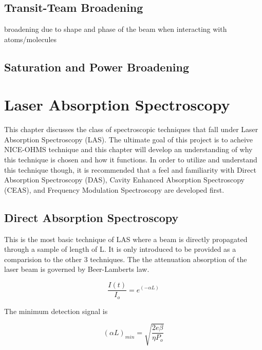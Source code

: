 \documentclass[11pt,a4paper]{book}
\begin{document}
		\subsection{Transit-Team Broadening}
			broadening due to shape and phase of the beam when interacting with atoms/molecules

		\subsection{Saturation and Power Broadening}
	\section{Laser Absorption Spectroscopy}
		\label{sec:Laser Absorption Spectroscopy}
		This chapter discusses the class of spectroscopic techniques that fall under Laser Absorption Spectroscopy (LAS). The ultimate goal of this project is to acheive NICE-OHMS technique and this chapter will develop an understanding of why this technique is chosen and how it functions. In order to utilize and understand this technique though, it is recommended that a feel and familiarity with Direct Absorption Spectroscopy (DAS), Cavity Enhanced Absorption Spectroscopy (CEAS), and Frequency Modulation Spectroscopy are developed first.	

		\subsection{Direct Absorption Spectroscopy}
			\label{subsec:Direct Absorption Spectroscopy}
			This is the most basic technique of LAS where a beam is directly propagated through a sample of length of L. It is only introduced to be provided as a comparision to the other 3 techniques. The the attenuation absorption of the laser beam is governed by Beer-Lamberts law.

			\begin{equation}
			\label{eq:BeerLamberts}
			\dfrac{I(t)}{I_o} = e^{(-\alpha L)}
			\end{equation}
			
			\noindent
			The minimum detection signal is \cite{NICE-OHMS}
			
			\begin{equation}
			\label{eq:DASlimit}
			(\alpha L)_{min}=\sqrt{\dfrac{2e\beta}{\eta P_o}}
			\end{equation}
			
\end{document}
